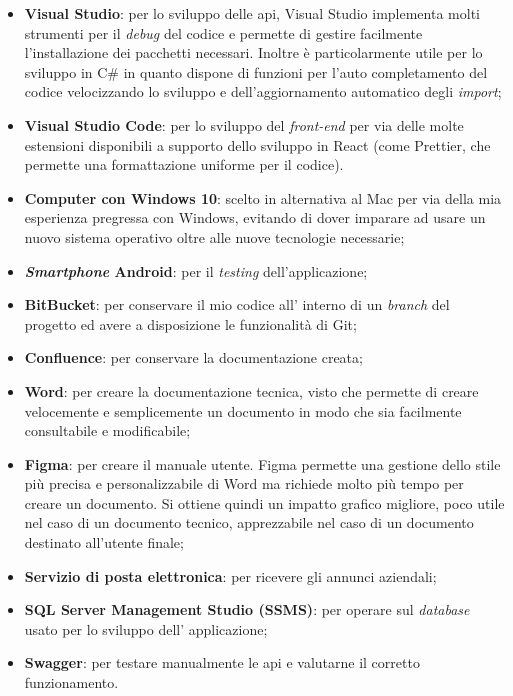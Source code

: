 \begin{itemize}
    \item \textbf{Visual Studio}: per lo sviluppo delle \gls{api}, Visual Studio implementa molti strumenti per 
          il \textit{debug} del codice e permette di gestire facilmente l'installazione dei pacchetti necessari. 
          Inoltre è particolarmente utile per lo sviluppo in C\# in quanto dispone di funzioni per l'auto completamento 
          del codice velocizzando lo sviluppo e dell'aggiornamento automatico degli \textit{import};
    \item \textbf{Visual Studio Code}: per lo sviluppo del \textit{front-end} per via delle molte estensioni 
          disponibili a supporto dello sviluppo in React (come Prettier, che permette una formattazione uniforme 
          per il codice).
    \item \textbf{Computer con Windows 10}: scelto in alternativa al Mac per via della mia esperienza pregressa 
          con Windows, evitando di dover imparare ad usare un nuovo sistema operativo oltre alle nuove tecnologie necessarie;
    \item \textbf{\textit{Smartphone} Android}: per il \textit{testing} dell'applicazione;
    \item \textbf{BitBucket}: per conservare il mio codice all' interno di un \textit{branch} del progetto ed avere a 
        disposizione le funzionalità di Git;
    \item \textbf{Confluence}: per conservare la documentazione creata;
    \item \textbf{Word}: per creare la documentazione tecnica, visto che permette di creare velocemente e semplicemente un 
          documento in modo che sia facilmente consultabile e modificabile;
    \item \textbf{Figma}: per creare il manuale utente. Figma permette una gestione dello stile più precisa e personalizzabile
          di Word ma richiede molto più tempo per creare un documento. Si ottiene quindi un impatto grafico migliore, poco utile nel 
          caso di un documento tecnico, apprezzabile nel caso di un documento destinato all'utente finale;
    \item \textbf{Servizio di posta elettronica}: per ricevere gli annunci aziendali;
    \item \textbf{SQL Server Management Studio (SSMS)}: per operare sul \textit{database} usato per lo sviluppo dell'
          applicazione;
    \item \textbf{Swagger}: per testare manualmente le \gls{api} e valutarne il corretto funzionamento.
\end{itemize}
